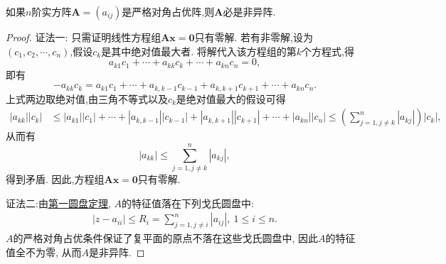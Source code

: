 \documentclass[../../main.tex]{subfiles}%
\begin{document}
\begin{proposition}[严格对角占优阵必是非异阵]\label{proposition:严格对角占优阵必是非异阵}
如果\(n\)阶实方阵\(\boldsymbol{A}=(a_{ij})\)是严格对角占优阵,则\(\boldsymbol{A}\)必是非异阵.
\end{proposition}
\begin{proof}

{\color{blue}证法一:}
只需证明线性方程组\(\boldsymbol{A}\boldsymbol{x}=\boldsymbol{0}\)只有零解. 若有非零解,设为\((c_1,c_2,\cdots,c_n)\),假设\(c_k\)是其中绝对值最大者. 将解代入该方程组的第\(k\)个方程式,得
\[
a_{k1}c_1+\cdots + a_{kk}c_k+\cdots + a_{kn}c_n = 0,
\]
即有
\[
-a_{kk}c_k=a_{k1}c_1+\cdots + a_{k,k - 1}c_{k - 1}+a_{k,k + 1}c_{k + 1}+\cdots + a_{kn}c_n.
\]
上式两边取绝对值,由三角不等式以及\(c_k\)是绝对值最大的假设可得
\begin{align*}
|a_{kk}||c_k|&\leqslant |a_{k1}||c_1|+\cdots + |a_{k,k - 1}||c_{k - 1}|+|a_{k,k + 1}||c_{k + 1}|+\cdots + |a_{kn}||c_n|\leqslant \left(\sum_{j = 1,j\neq k}^{n}|a_{kj}|\right)|c_k|,
\end{align*}
从而有
\[
|a_{kk}|\leqslant \sum_{j = 1,j\neq k}^{n}|a_{kj}|,
\]
得到矛盾. 因此,方程组\(\boldsymbol{A}\boldsymbol{x}=\boldsymbol{0}\)只有零解.

{\color{blue}证法二:}由\hyperref[theorem:第一圆盘定理]{第一圆盘定理}, \(A\)的特征值落在下列戈氏圆盘中:
\begin{align*}
|z - a_{ii}| \leqslant  R_{i} = \sum_{j = 1,j\neq i}^{n}|a_{ij}|,\ 1 \leqslant  i \leqslant  n.
\end{align*}
\(A\)的严格对角占优条件保证了复平面的原点不落在这些戈氏圆盘中, 因此\(A\)的特征值全不为零, 从而\(A\)是非异阵.


\end{proof}
\end{document}

